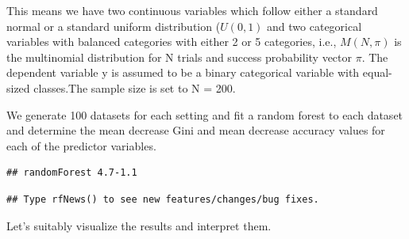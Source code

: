 \documentclass[
]{article}
\begin{document}
This means we have two continuous variables which follow either a
standard normal or a standard uniform distribution (\(U(0, 1)\) and two
categorical variables with balanced categories with either 2 or 5
categories, i.e., \(M(N, \pi)\) is the multinomial distribution for N
trials and success probability vector \(\pi\). The dependent variable y
is assumed to be a binary categorical variable with equal-sized
classes.The sample size is set to N = 200.

We generate 100 datasets for each setting and fit a random forest to
each dataset and determine the mean decrease Gini and mean decrease
accuracy values for each of the predictor variables.

\begin{verbatim}
## randomForest 4.7-1.1
\end{verbatim}

\begin{verbatim}
## Type rfNews() to see new features/changes/bug fixes.
\end{verbatim}

Let's suitably visualize the results and interpret them.
\end{document}
